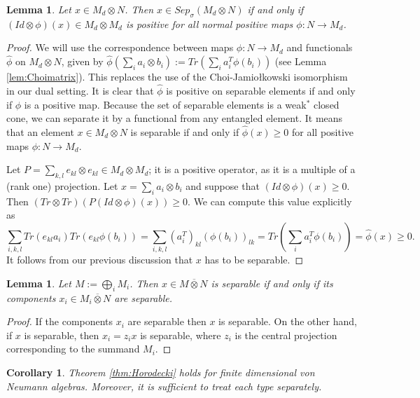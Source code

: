\documentclass[11pt]{article}
\numberwithin{theorem}{section}
\newtheorem{lemma}[theorem]{Lemma}
\newtheorem{corollary}[theorem]{Corollary}
\begin{document}
\begin{lemma}\label{lem:findimhorodecki}
Let $x \in M_d \otimes N$. Then $x\in Sep_{\sigma}(M_d\otimes N)$ if and only if $(Id\otimes \phi)(x) \in M_d\otimes M_d$ is positive for all normal positive maps $\phi: N \to M_d$. 
\end{lemma}
\begin{proof}
We will use the correspondence between maps $\phi: N \to M_d$ and functionals $\widehat{\phi}$ on $M_d \otimes N$, given by $\widehat{\phi}(\sum_{i} a_{i} \otimes b_{i}) := Tr(\sum_{i} a_{i}^{T} \phi(b_{i}))$ (see Lemma \ref{lem:Choimatrix}). This replaces the use of the Choi-Jamio{\l}kowski isomorphism in our dual setting. It is clear that $\widehat{\phi}$ is positive on separable elements if and only if $\phi$ is a positive map. Because the set of separable elements is a weak$^{\ast}$ closed cone, we can separate it by a functional from any entangled element. It means that an element $x\in M_{d}\otimes N$ is separable if and only if $\widehat{\phi}(x)\geqslant 0$ for all positive maps $\phi: N \to M_d$. 

Let $P= \sum_{k,l} e_{kl}\otimes e_{kl} \in M_{d} \otimes M_d$; it is a positive operator, as it is a multiple of a (rank one) projection. Let $x = \sum_{i} a_{i} \otimes b_{i}$ and suppose that $(Id \otimes \phi)(x) \geqslant 0$. Then $(Tr\otimes Tr)(P (Id \otimes \phi)(x))\geqslant 0$. We can compute this value explicitly as
\[
\sum_{i,k,l} Tr(e_{kl} a_{i})Tr(e_{kl}\phi(b_i)) = \sum_{i,k,l} (a_{i}^{T})_{kl} (\phi(b_i))_{lk} = Tr(\sum_{i} a_{i}^{T} \phi(b_{i})) = \widehat{\phi}(x) \geqslant 0.
\]
It follows from our previous discussion that $x$ has to be separable.
\end{proof}
\begin{lemma}\label{lem:separablesplit}
Let $M := \bigoplus_{i} M_{i}$. Then $x \in M \overline{\otimes} N$ is separable if and only if its components $x_{i} \in M_{i} \overline{\otimes} N$ are separable.
\end{lemma}
\begin{proof}
If the components $x_i$ are separable then $x$ is separable. On the other hand, if $x$ is separable, then $x_{i} = z_{i} x$ is separable, where $z_i$ is the central projection corresponding to the summand $M_i$.
\end{proof}
\begin{corollary}\label{cor:findimhorodecki}
Theorem \ref{thm:Horodecki} holds for finite dimensional von Neumann algebras. Moreover, it is sufficient to treat each type separately.
\end{corollary}
\end{document}
